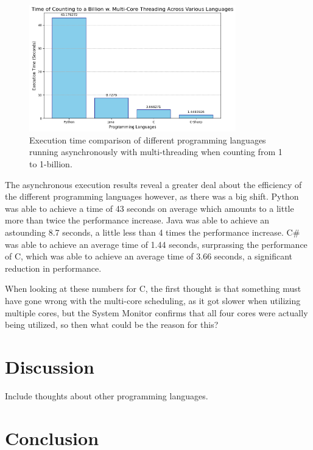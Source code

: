 \documentclass[12pt,a4paper]{article}
\begin{document}
\begin{figure}[!htb]
    \centering
    \includegraphics[width=0.8\textwidth]{../async_records/async_exec_times.png}
    \captionsetup{font=tiny, justification=centering}
    \caption{Execution time comparison of different programming languages running asynchronously with multi-threading when counting from 1 to 1-billion.}
    \label{fig:async-exec-times}
\end{figure}

The asynchronous execution results reveal a greater deal about the efficiency of the different programming languages however, as there was a big shift. Python was able to achieve a time of 43 seconds on average which amounts to a little more than twice the performance increase. Java was able to achieve an astounding 8.7 seconds, a little less than 4 times the performance increase. C\# was able to achieve an average time of 1.44 seconds, surprassing the performance of C, which was able to achieve an average time of 3.66 seconds, a significant reduction in performance.

When looking at these numbers for C, the first thought is that something must have gone wrong with the multi-core scheduling, as it got slower when utilizing multiple cores, but the System Monitor confirms that all four cores were actually being utilized, so then what could be the reason for this?

\newpage
\section{Discussion}

Include thoughts about other programming languages.

\newpage
\section{Conclusion}
\end{document}
